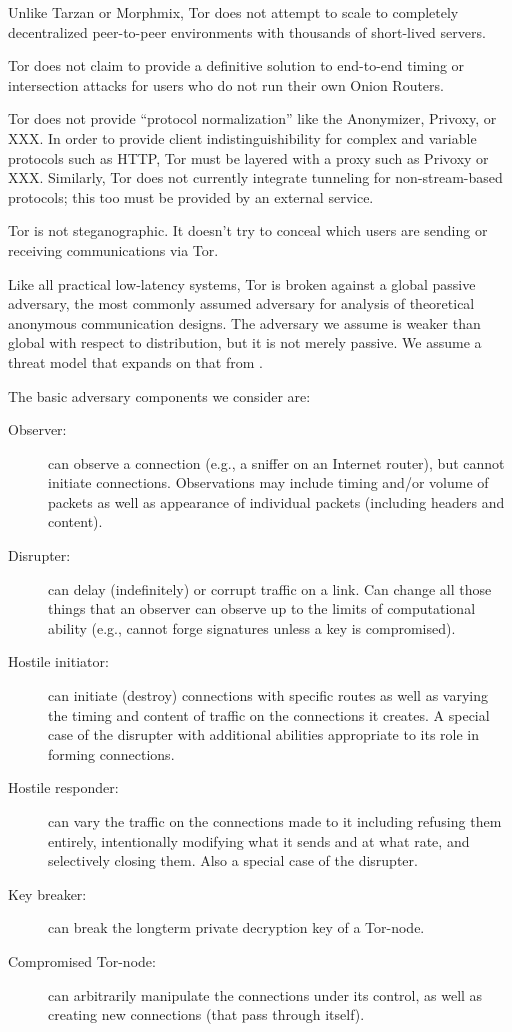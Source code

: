 \documentclass[times,10pt,twocolumn]{article}
\begin{document}
Unlike Tarzan or Morphmix, Tor does not attempt to scale to completely
decentralized peer-to-peer environments with thousands of short-lived
servers. 

Tor does not claim to provide a definitive solution to end-to-end
timing or intersection attacks for users who do not run their own
Onion Routers.

Tor does not provide ``protocol normalization'' like the Anonymizer,
Privoxy, or XXX.  In order to provide client indistinguishibility for
complex and variable protocols such as HTTP, Tor must be layered with
a proxy such as Privoxy or XXX.  Similarly, Tor does not currently
integrate tunneling for non-stream-based protocols; this too must be
provided by an external service.

Tor is not steganographic. It doesn't try to conceal which users are
sending or receiving communications via Tor.


\label{subsec:adversary-model}

Like all practical low-latency systems, Tor is broken against a global
passive adversary, the most commonly assumed adversary for analysis of
theoretical anonymous communication designs. The adversary we assume
is weaker than global with respect to distribution, but it is not
merely passive.
We assume a threat model that expands on that from \cite{or-pet00}.


The basic adversary components we consider are:
\begin{description}
\item[Observer:] can observe a connection (e.g., a sniffer on an
  Internet router), but cannot initiate connections. Observations may
  include timing and/or volume of packets as well as appearance of
  individual packets (including headers and content).
\item[Disrupter:] can delay (indefinitely) or corrupt traffic on a
  link. Can change all those things that an observer can observe up to
  the limits of computational ability (e.g., cannot forge signatures
  unless a key is compromised).
\item[Hostile initiator:] can initiate (destroy) connections with
  specific routes as well as varying the timing and content of traffic
  on the connections it creates. A special case of the disrupter with
  additional abilities appropriate to its role in forming connections.
\item[Hostile responder:] can vary the traffic on the connections made
  to it including refusing them entirely, intentionally modifying what
  it sends and at what rate, and selectively closing them. Also a
  special case of the disrupter.
\item[Key breaker:] can break the longterm private decryption key of a
  Tor-node.
\item[Compromised Tor-node:] can arbitrarily manipulate the connections
  under its control, as well as creating new connections (that pass
  through itself).
\end{description}
\end{document}
